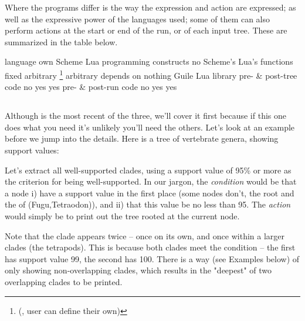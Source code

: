 Where the programs differ is the way the expression and action are expressed; as
well as the expressive power of the languages used; some of them can also
perform actions at the start or end of the run, or of each input tree. These are
summarized in the table below.

\startplacesilenttable
  \startlocalfootnotes

		\starttabulate[|l|l|l|l|]
			\NC \NC \ed \NC \sched \NC \luaed \NC\NR
			\HL
			\NC language 								\NC own 		\NC Scheme 		\NC Lua \NC\NR
			\NC programming constructs 	\NC no 			\NC Scheme's 	\NC Lua's \NC\NR
			\NC functions 							\NC fixed		\NC arbitrary \footnote{(\ie, user can define their own)} \NC arbitrary \NC\NR
			\NC depends on 							\NC nothing \NC \gnu{} Guile \NC Lua library \NC\NR
			\NC pre- \& post-tree code 	\NC no 			\NC yes 			\NC yes \NC\NR
			\NC pre- \& post-run code 	\NC no 			\NC yes 			\NC yes \NC\NR
		\stoptabulate

		\placelocalfootnotes

  \stoplocalfootnotes
\stopplacesilenttable

\subsection[sct:luaed]{\luaed}


Although \luaed{} is the most recent of the three, we'll cover it first because
if this one does what you need it's unlikely you'll need the others.  Let's look
at an example before we jump into the details. Here is a tree of vertebrate
genera, showing support values:

\startalignment[center]
\externalfigure[ed_1_svg]
\stopalignment

Let's extract all well-supported clades, using a support value of
95\% or more as the criterion for being well-supported. In our jargon, the
{\em condition} would be that a node i) have a support value in the first place
(some nodes don't, \eg{} the root and the \lca{} of (Fugu,Tetraodon)), and ii)
that this value be no less than 95. The {\em action} would simply be to print
out the tree rooted at the current node.

\page[no]


Note that the  clade appears twice -- once on
its own, and once within a larger clades (the tetrapods). This is because both
clades meet the condition -- the first has support value 99, the second has 100.
There is a way (see Examples below) of only showing non-overlapping clades,
which results in the "deepest" of two overlapping clades to be printed.

